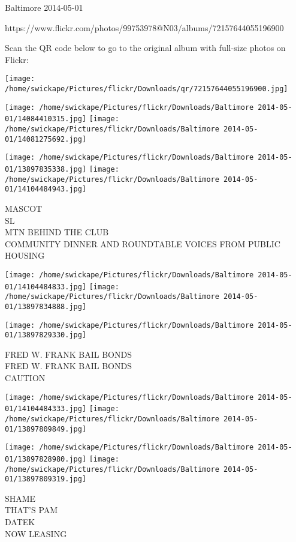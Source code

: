 \documentclass[10pt,letterpaper]{article}
\begin{document}
Baltimore 2014-05-01

https://www.flickr.com/photos/99753978@N03/albums/72157644055196900

Scan the QR code below to go to the original album with full-size photos on Flickr:

\texttt{[image: /home/swickape/Pictures/flickr/Downloads/qr/72157644055196900.jpg]}
\pagebreak

\texttt{[image: /home/swickape/Pictures/flickr/Downloads/Baltimore 2014-05-01/14084410315.jpg]}
\texttt{[image: /home/swickape/Pictures/flickr/Downloads/Baltimore 2014-05-01/14081275692.jpg]}

\texttt{[image: /home/swickape/Pictures/flickr/Downloads/Baltimore 2014-05-01/13897835338.jpg]}
\texttt{[image: /home/swickape/Pictures/flickr/Downloads/Baltimore 2014-05-01/14104484943.jpg]}

MASCOT\\
SL\\
MTN BEHIND THE CLUB\\
COMMUNITY DINNER AND ROUNDTABLE VOICES FROM PUBLIC HOUSING\\
\pagebreak

\texttt{[image: /home/swickape/Pictures/flickr/Downloads/Baltimore 2014-05-01/14104484833.jpg]}
\texttt{[image: /home/swickape/Pictures/flickr/Downloads/Baltimore 2014-05-01/13897834888.jpg]}

\vspace{0.25in}
\texttt{[image: /home/swickape/Pictures/flickr/Downloads/Baltimore 2014-05-01/13897829330.jpg]}

FRED W. FRANK BAIL BONDS\\
FRED W. FRANK BAIL BONDS\\
CAUTION\\
\pagebreak

\texttt{[image: /home/swickape/Pictures/flickr/Downloads/Baltimore 2014-05-01/14104484333.jpg]}
\texttt{[image: /home/swickape/Pictures/flickr/Downloads/Baltimore 2014-05-01/13897809849.jpg]}

\texttt{[image: /home/swickape/Pictures/flickr/Downloads/Baltimore 2014-05-01/13897828980.jpg]}
\texttt{[image: /home/swickape/Pictures/flickr/Downloads/Baltimore 2014-05-01/13897809319.jpg]}

SHAME\\
THAT'S PAM\\
DATEK\\
NOW LEASING\\
\pagebreak
\end{document}
